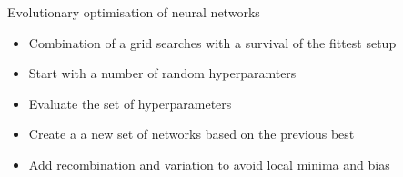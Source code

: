 \begin{frame}{Evolutionary optimisation of neural networks}
    \begin{itemize}
        \item Combination of a grid searches with a survival of the fittest setup
        \vspace{0.2cm}
        \item Start with a number of random hyperparamters
        \vspace{0.2cm}
        \item Evaluate the set of hyperparameters
        \vspace{0.2cm}
        \item Create a a new set of networks based on the previous best
        \vspace{0.2cm}
        \item Add recombination and variation to avoid local minima and bias
    \end{itemize}
\end{frame}